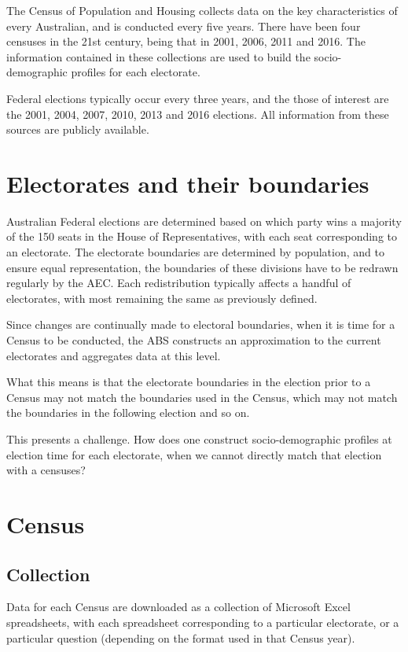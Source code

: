 \documentclass{monashthesis}
\theoremstyle{definition}
\theoremstyle{definition}
\theoremstyle{definition}
\theoremstyle{remark}
\begin{document}
The Census of Population and Housing collects data on the key
characteristics of every Australian, and is conducted every five years.
There have been four censuses in the 21st century, being that in 2001,
2006, 2011 and 2016. The information contained in these collections are
used to build the socio-demographic profiles for each electorate.

Federal elections typically occur every three years, and the those of
interest are the 2001, 2004, 2007, 2010, 2013 and 2016 elections. All
information from these sources are publicly available.

\section{Electorates and their
boundaries}\label{electorates-and-their-boundaries}

Australian Federal elections are determined based on which party wins a
majority of the 150 seats in the House of Representatives, with each
seat corresponding to an electorate. The electorate boundaries are
determined by population, and to ensure equal representation, the
boundaries of these divisions have to be redrawn regularly by the AEC.
Each redistribution typically affects a handful of electorates, with
most remaining the same as previously defined.

Since changes are continually made to electoral boundaries, when it is
time for a Census to be conducted, the ABS constructs an approximation
to the current electorates and aggregates data at this level.

What this means is that the electorate boundaries in the election prior
to a Census may not match the boundaries used in the Census, which may
not match the boundaries in the following election and so on.

This presents a challenge. How does one construct socio-demographic
profiles at election time for each electorate, when we cannot directly
match that election with a censuses?

\section{Census}\label{census}

\subsection{Collection}\label{collection}

Data for each Census are downloaded as a collection of Microsoft Excel
spreadsheets, with each spreadsheet corresponding to a particular
electorate, or a particular question (depending on the format used in
that Census year).
\end{document}
